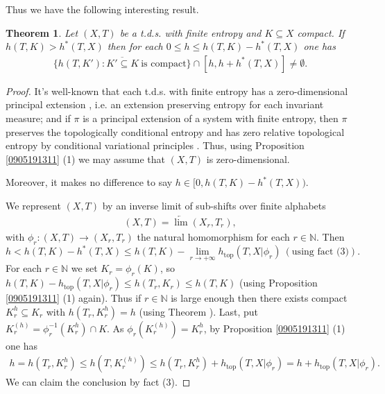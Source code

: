 \documentclass[12pt]{amsart}
\newtheorem{thm}{Theorem}[section]
\theoremstyle{definition} \theoremstyle{question}
\numberwithin{equation}{section}
\begin{document}
Thus we have the following interesting result.

\begin{thm} \label{interpret}
Let $(X, T)$ be a t.d.s. with finite entropy and $K\subseteq X$
compact. If $h (T, K)> h^* (T, X)$ then for each $0\le h\le h (T,
K)- h^* (T, X)$ one has
\begin{eqnarray*}
\overline{\{h (T, K'): K'\subseteq K\ \text{is compact}\}}\cap [h,
h+ h^* (T, X)]\neq \emptyset.
\end{eqnarray*}
\end{thm}
\begin{proof}
It's well-known that each t.d.s. with finite entropy has a
zero-dimensional principal extension \cite[Proposition 7.8]{BD},
i.e. an extension preserving entropy for each invariant measure; and
if $\pi$ is a principal extension of a system with finite entropy,
then $\pi$ preserves the topologically conditional entropy
\cite[Theorem 3]{Le} and has zero relative topological entropy by
conditional variational principles \cite[Theorems 3 and 4]{DS}.
Thus, using Proposition \ref{0905191311} (1) we may assume that $(X,
T)$ is zero-dimensional.

 Moreover, it
makes no difference to say $h\in [0, h (T, K)- h^* (T, X))$.

We represent $(X, T)$ by an inverse limit of sub-shifts over finite
alphabets
\begin{eqnarray*}
(X, T)= \underleftarrow{\lim} (X_r, T_r),
\end{eqnarray*}
with $\phi_r: (X, T)\rightarrow (X_r, T_r)$ the natural homomorphism
for each $r\in \mathbb{N}$. Then
\begin{equation*}
h< h (T, K)- h^* (T, X)\le h (T, K)- \lim_{r\rightarrow +\infty}
h_{\text{top}} (T, X| \phi_r)\ (\text{using fact (3)}).
\end{equation*}
For each $r\in \mathbb{N}$ we set $K_r= \phi_r (K)$, so $h (T, K)-
h_{\text{top}} (T, X| \phi_r)\le h (T_r, K_r)\le h (T, K)$ (using
Proposition \ref{0905191311}
(1) again). Thus if $r\in \mathbb{N}$ is large
enough then there exists compact $K^h_r\subseteq K_r$ with $h (T_r,
K^h_r)= h$ (using Theorem \cite[Theorem 5.4]{HYZ1}). Last, put
$K_r^{(h)}= \phi_r^{- 1} (K_r^h)\cap K$. As $\phi_r (K_r^{(h)})=
K_r^h$, by Proposition \ref{0905191311} (1) one has
\begin{eqnarray*}
h= h (T_r, K_r^h)\le h (T, K_r^{(h)})\le h (T_r, K_r^h)+
h_{\text{top}} (T, X| \phi_r)= h+ h_{\text{top}} (T, X| \phi_r).
\end{eqnarray*}
We can claim the conclusion by fact (3).
\end{proof}
\end{document}
